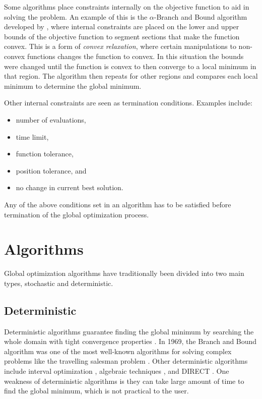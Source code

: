 Some algorithms place constraints internally on the objective function to aid in solving the problem. An example of this is the $\alpha$-Branch and Bound algorithm developed by \cite{adjiman2013}, where internal constraints are placed on the lower and upper bounds of the objective function to segment sections that make the function convex. This is a form of \textit{convex relaxation}, where certain manipulations to non-convex functions
changes the function to convex. In this situation the bounds were changed until the function is convex to then converge to a local minimum in that region. The algorithm then repeats for other regions and compares each local minimum to determine the global minimum. 

Other internal constraints are seen as termination conditions. Examples include:
\begin{itemize}
    \item number of evaluations,
    \item time limit,
    \item function tolerance,
    \item position tolerance, and
    \item no change in current best solution.
\end{itemize}

Any of the above conditions set in an algorithm has to be satisfied before termination of the global optimization process. 

\section{Algorithms}
Global optimization algorithms have traditionally been divided into two main types, stochastic and deterministic. 
\subsection{Deterministic}
Deterministic algorithms guarantee finding the global minimum by searching the whole
domain with tight convergence properties \cite{Pinter2002}. In 1969, the Branch and Bound algorithm \cite{Liberti2000} was one of the most well-known algorithms for solving complex problems like the travelling salesman problem \cite{Liberti2000}. Other deterministic algorithms include interval optimization \cite{Accary2008}, algebraic techniques \cite{Veltman1972}, and DIRECT \cite{Jones1993}. One weakness of deterministic algorithms is they can take large amount of time to find the global minimum, which is not practical to the user. 
